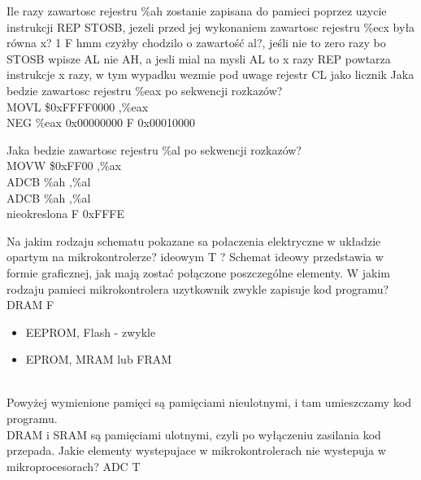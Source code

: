 	\answer
	{Ile razy zawartosc rejestru \%ah zostanie zapisana do pamieci poprzez uzycie instrukcji REP STOSB, jezeli przed jej wykonaniem zawartosc rejestru \%ecx była równa x?}
	{1}
	{F}
	{hmm czyżby chodzilo o zawartość al?, jeśli nie to zero razy bo STOSB wpisze AL nie AH, a jesli mial na mysli AL to x razy}
	{REP powtarza instrukcje x razy, w tym wypadku wezmie pod uwage rejestr CL jako licznik}
	\answer
	{
		Jaka bedzie zawartosc rejestru \%eax po sekwencji rozkazów?\\
		MOVL \$0xFFFF0000 ,\%eax\\
		NEG \%eax
	}
	{0x00000000}
	{F}
	{0x00010000}
	{
		
	}
	\answer
	{Jaka bedzie zawartosc rejestru \%al po sekwencji rozkazów? \\
		MOVW \$0xFF00 ,\%ax\\
		ADCB \%ah ,\%al\\
		ADCB \%ah ,\%al\\
	}
	{nieokreslona}
	{F}
	{0xFFFE}
	{
		
	}
	\answer
	{Na jakim rodzaju schematu pokazane sa połaczenia elektryczne w układzie opartym na mikrokontrolerze?}
	{ideowym}
	{T}
	{?}
	{Schemat ideowy przedstawia w formie graficznej, jak mają zostać połączone poszczególne elementy.}
	\answer
	{W jakim rodzaju pamieci mikrokontrolera uzytkownik zwykle zapisuje kod programu?}
	{DRAM}
	{F}
	{
		\begin{itemize}
			\item EEPROM, Flash - zwykle
			\item EPROM, MRAM lub FRAM
		\end{itemize}
	}
	\\{Powyżej wymienione pamięci są pamięciami nieulotnymi, i tam umieszczamy kod programu.\\DRAM i SRAM są pamięciami ulotnymi, czyli po wyłączeniu zasilania kod przepada.}
	\answer
	{Jakie elementy wystepujace w mikrokontrolerach nie wystepuja w mikroprocesorach?}
	{ADC}
	{T}
	{}

